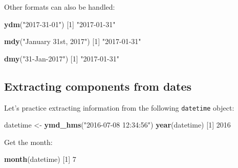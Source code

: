 \documentclass[]{book}
\newenvironment{Shaded}{\begin{snugshade}}{\end{snugshade}}
\newcommand{\DecValTok}[1]{\textcolor[rgb]{0.00,0.00,0.81}{#1}}
\newcommand{\KeywordTok}[1]{\textcolor[rgb]{0.13,0.29,0.53}{\textbf{#1}}}
\newcommand{\NormalTok}[1]{#1}
\newcommand{\StringTok}[1]{\textcolor[rgb]{0.31,0.60,0.02}{#1}}
\begin{document}
Other formats can also be handled:

\begin{Shaded}
\begin{Highlighting}[]
\KeywordTok{ydm}\NormalTok{(}\StringTok{"2017-31-01"}\NormalTok{)}
\NormalTok{[}\DecValTok{1}\NormalTok{] }\StringTok{"2017-01-31"}
\end{Highlighting}
\end{Shaded}

\begin{Shaded}
\begin{Highlighting}[]
\KeywordTok{mdy}\NormalTok{(}\StringTok{"January 31st, 2017"}\NormalTok{)}
\NormalTok{[}\DecValTok{1}\NormalTok{] }\StringTok{"2017-01-31"}
\end{Highlighting}
\end{Shaded}

\begin{Shaded}
\begin{Highlighting}[]
\KeywordTok{dmy}\NormalTok{(}\StringTok{"31-Jan-2017"}\NormalTok{)}
\NormalTok{[}\DecValTok{1}\NormalTok{] }\StringTok{"2017-01-31"}
\end{Highlighting}
\end{Shaded}

\hypertarget{extracting-components-from-dates}{%
\subsection*{Extracting components from dates}\label{extracting-components-from-dates}}

Let's practice extracting information from the following \texttt{datetime} object:

\begin{Shaded}
\begin{Highlighting}[]
\NormalTok{datetime <-}\StringTok{ }\KeywordTok{ymd_hms}\NormalTok{(}\StringTok{"2016-07-08 12:34:56"}\NormalTok{)}
\KeywordTok{year}\NormalTok{(datetime)}
\NormalTok{[}\DecValTok{1}\NormalTok{] }\DecValTok{2016}
\end{Highlighting}
\end{Shaded}

Get the month:

\begin{Shaded}
\begin{Highlighting}[]
\KeywordTok{month}\NormalTok{(datetime)}
\NormalTok{[}\DecValTok{1}\NormalTok{] }\DecValTok{7}
\end{Highlighting}
\end{Shaded}
\end{document}
